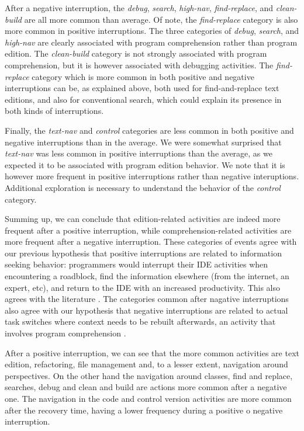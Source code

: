 \documentclass[times]{smrauth}
\newcommand\RR[1]{\textbf{Romain #1}}
\begin{document}
After a negative interruption, the \emph{debug}, \emph{search}, \emph{high-nav}, \emph{find-replace}, and \emph{clean-build} are all more common than average. Of note, the \emph{find-replace} category is also more common in positive interruptions. The three categories of \emph{debug}, \emph{search}, and \emph{high-nav} are clearly associated with program comprehension rather than program edition. The \emph{clean-build} category is not strongly associated with program comprehension, but it is however associated with debugging activities. The \emph{find-replace} category which is more common in both positive and negative interruptions can be, as explained above, both used for find-and-replace text editions, and also for conventional search, which could explain its presence in both kinds of interruptions.

Finally, the \emph{text-nav} and \emph{control} categories are less common in both positive and negative interruptions than in the average. We were somewhat surprised that \emph{text-nav} was less common in positive interruptions than the average, as we expected it to be associated with program edition behavior. We note that it is however more frequent in positive interruptions rather than negative interuptions. Additional exploration is necessary to understand the behavior of the \emph{control} category.

Summing up, we can conclude that edition-related activities are indeed more frequent after a positive interruption, while comprehension-related activities are more frequent after a negative interruption.  These categories of events agree with our previous hypothesis that positive interruptions are related to information seeking behavior: programmers would interrupt their IDE activities when encountering a roadblock, find the information elsewhere (from the internet, an expert, etc), and return to the IDE with an increased productivity. This also agrees with the literature \cite{PR11, LVD06}. The categories common after nagative interruptions  also agree with our hypothesis that negative interruptions are related to actual task switches where context needs to be rebuilt afterwards, an activity that involves program comprehension \cite{MMLK14, PR12}. %

After a positive interruption, we can see that the more common activities are text edition, refactoring, file management and, to a lesser extent, navigation around perspectives. On the other hand the navigation around classes, find and replace, searches, debug and clean and build are actions more common after a negative one. The navigation in the code and control version activities are more common after the recovery time, having a lower frequency during a positive o negative interruption. 
\end{document}
